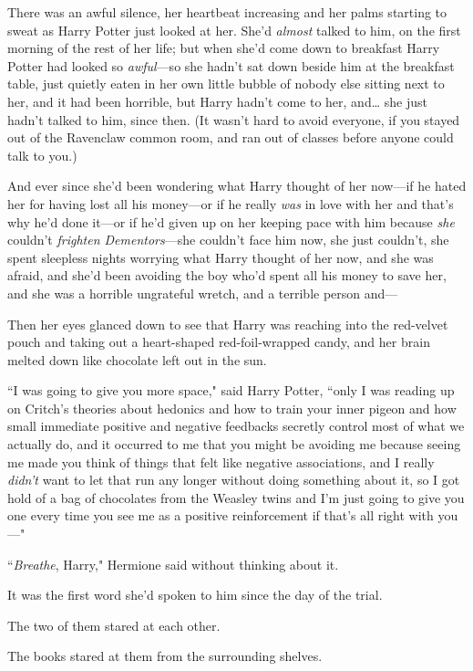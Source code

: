 There was an awful silence, her heartbeat increasing and her palms starting to sweat as Harry Potter just looked at her. She'd \emph{almost} talked to him, on the first morning of the rest of her life; but when she'd come down to breakfast Harry Potter had looked so \emph{awful}—so she hadn't sat down beside him at the breakfast table, just quietly eaten in her own little bubble of nobody else sitting next to her, and it had been horrible, but Harry hadn't come to her, and{\ldots} she just hadn't talked to him, since then. (It wasn't hard to avoid everyone, if you stayed out of the Ravenclaw common room, and ran out of classes before anyone could talk to you.)

And ever since she'd been wondering what Harry thought of her now—if he hated her for having lost all his money—or if he really \emph{was} in love with her and that's why he'd done it—or if he'd given up on her keeping pace with him because \emph{she} couldn't \emph{frighten Dementors}—she couldn't face him now, she just couldn't, she spent sleepless nights worrying what Harry thought of her now, and she was afraid, and she'd been avoiding the boy who'd spent all his money to save her, and she was a horrible ungrateful wretch, and a terrible person and—

Then her eyes glanced down to see that Harry was reaching into the red-velvet pouch and taking out a heart-shaped red-foil-wrapped candy, and her brain melted down like chocolate left out in the sun.

``I was going to give you more space," said Harry Potter, ``only I was reading up on Critch's theories about hedonics and how to train your inner pigeon and how small immediate positive and negative feedbacks secretly control most of what we actually do, and it occurred to me that you might be avoiding me because seeing me made you think of things that felt like negative associations, and I really \emph{didn't} want to let that run any longer without doing something about it, so I got hold of a bag of chocolates from the Weasley twins and I'm just going to give you one every time you see me as a positive reinforcement if that's all right with you—"

``\emph{Breathe}, Harry," Hermione said without thinking about it.

It was the first word she'd spoken to him since the day of the trial.

The two of them stared at each other.

The books stared at them from the surrounding shelves.

